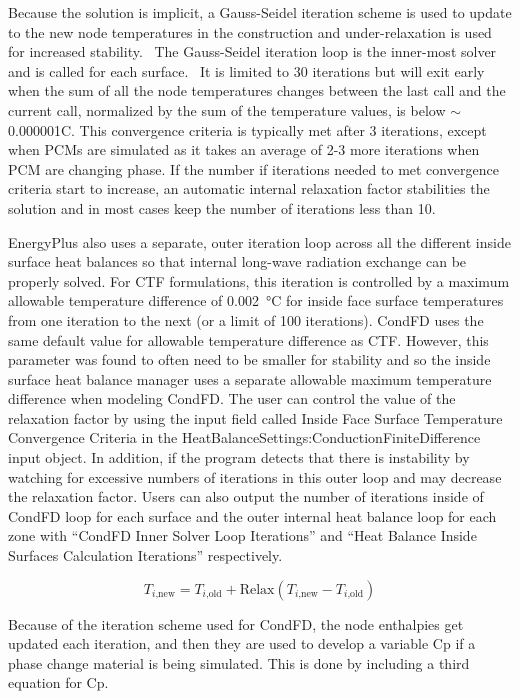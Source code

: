 Because the solution is implicit, a Gauss-Seidel iteration scheme is used to
update to the new node temperatures in the construction and under-relaxation is
used for increased stability.~ The Gauss-Seidel iteration loop is the inner-most
solver and is called for each surface.~ It is limited to 30 iterations but will
exit early when the sum of all the node temperatures changes between the last
call and the current call, normalized by the sum of the temperature values, is
below $\sim$0.000001C. This convergence criteria is typically met after 3
iterations, except when PCMs are simulated as it takes an average of 2-3 more
iterations when PCM are changing phase. If the number if iterations needed to
met convergence criteria start to increase, an automatic internal relaxation
factor stabilities the solution and in most cases keep the number of iterations
less than 10.

EnergyPlus also uses a separate, outer iteration loop across all the different
inside surface heat balances so that internal long-wave radiation exchange can
be properly solved. For CTF formulations, this iteration is controlled by a
maximum allowable temperature difference of \SI{0.002}{\celsius} for inside face
surface temperatures from one iteration to the next (or a limit of 100 iterations).
CondFD uses the same default value for allowable temperature difference as CTF.
However, this parameter was found to often need to be smaller for stability and
so the inside surface heat balance manager uses a separate allowable maximum
temperature difference when modeling CondFD. The user can control the value of
the relaxation factor by using the input field called Inside Face Surface
Temperature Convergence Criteria in the
HeatBalanceSettings:ConductionFiniteDifference input object. In addition, if
the program detects that there is instability by watching for excessive numbers
of iterations in this outer loop and may decrease the relaxation factor. Users
can also output the number of iterations inside of CondFD loop for each surface
and the outer internal heat balance loop for each zone with ``CondFD Inner
Solver Loop Iterations'' and ``Heat Balance Inside Surfaces Calculation
Iterations'' respectively.

\begin{equation}
T_{\text{$i$,new}} = T_{\text{$i$,old}}
                         + \text{Relax}\left(T_{\text{$i$,new}}
                            - T_{\text{$i$,old}} \right)
\end{equation}

Because of the iteration scheme used for CondFD, the node enthalpies get
updated each iteration, and then they are used to develop a variable Cp if a
phase change material is being simulated. This is done by including a third
equation for Cp.

